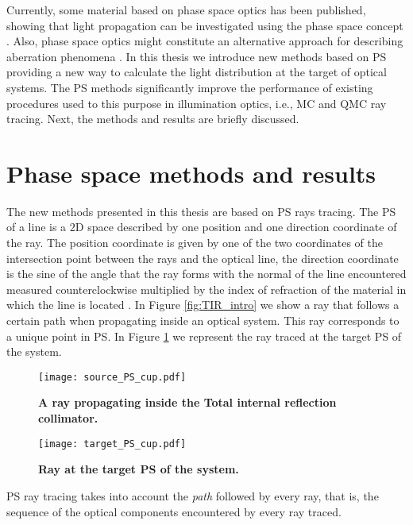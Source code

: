 Currently, some material based on phase space optics has been published, showing that light propagation can be investigated using the phase space concept \cite{rausch2012phase,rausch2014phase, herkommer2012phase}. Also, phase space optics might constitute an alternative approach for describing aberration phenomena \cite{herkommer2013phase, babington2017freeform, wolf1993relativistic}. In this thesis we introduce new methods based on PS providing a new way to calculate the light distribution at the target of optical systems. The PS methods significantly improve the performance of existing procedures used to this purpose in illumination optics, i.e., MC and QMC ray tracing. 
Next, the methods and results are briefly discussed. 
\section{Phase space methods and results}
The new methods presented in this thesis are based on PS rays tracing. The PS of a line is a $2$D space described by one position and one direction coordinate of the ray. 
The position coordinate is given by one of the two coordinates of the intersection point between the rays and the optical line, the direction coordinate is the sine of the angle that the ray forms with the normal of the line encountered measured counterclockwise multiplied by the index of refraction of the material in which the line is located \cite{wolf2004geometric}. In Figure \ref{fig:TIR_intro} we show a ray that follows a certain path when propagating inside an optical system. This ray corresponds to a unique point in PS. In Figure \ref{fig:PS_intro} we represent the ray traced at the target PS of the system.
\begin{figure}[t]
  \begin{minipage}[t]{0.49\textwidth}
\centering
    \texttt{[image: source\_PS\_cup.pdf]}
    \caption{\textbf{A ray propagating inside the Total internal reflection collimator.}}
    \label{fig:TIR_intro}
  \end{minipage}
\hfill
  \begin{minipage}[t]{0.49\textwidth}
\centering
    \texttt{[image: target\_PS\_cup.pdf]}
  \caption{\textbf{Ray at the target PS of the system.}}
\label{fig:PS_intro}
 \end{minipage}
\end{figure}
PS ray tracing takes into account the \textit{path} followed by every ray, that is, the sequence of the optical components encountered by every ray traced.
